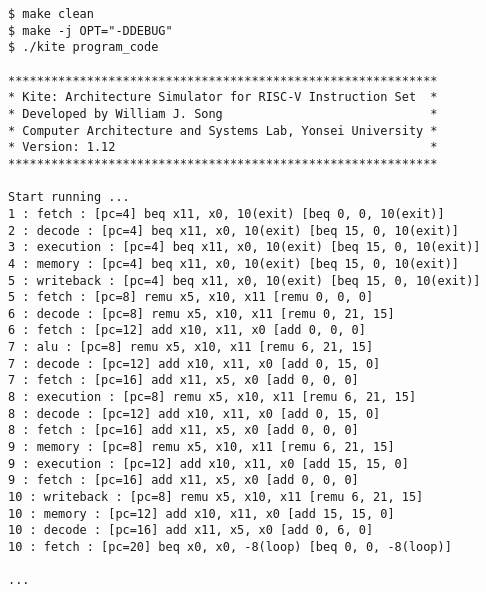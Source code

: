 \documentclass[10pt]{article}
\begin{document}
\begin{Verbatim}[frame=single,fontsize=\small]
$ make clean
$ make -j OPT="-DDEBUG" 
$ ./kite program_code

************************************************************
* Kite: Architecture Simulator for RISC-V Instruction Set  *
* Developed by William J. Song                             *
* Computer Architecture and Systems Lab, Yonsei University *
* Version: 1.12                                            *
************************************************************

Start running ...
1 : fetch : [pc=4] beq x11, x0, 10(exit) [beq 0, 0, 10(exit)]
2 : decode : [pc=4] beq x11, x0, 10(exit) [beq 15, 0, 10(exit)]
3 : execution : [pc=4] beq x11, x0, 10(exit) [beq 15, 0, 10(exit)]
4 : memory : [pc=4] beq x11, x0, 10(exit) [beq 15, 0, 10(exit)]
5 : writeback : [pc=4] beq x11, x0, 10(exit) [beq 15, 0, 10(exit)]
5 : fetch : [pc=8] remu x5, x10, x11 [remu 0, 0, 0]
6 : decode : [pc=8] remu x5, x10, x11 [remu 0, 21, 15]
6 : fetch : [pc=12] add x10, x11, x0 [add 0, 0, 0]
7 : alu : [pc=8] remu x5, x10, x11 [remu 6, 21, 15]
7 : decode : [pc=12] add x10, x11, x0 [add 0, 15, 0]
7 : fetch : [pc=16] add x11, x5, x0 [add 0, 0, 0]
8 : execution : [pc=8] remu x5, x10, x11 [remu 6, 21, 15]
8 : decode : [pc=12] add x10, x11, x0 [add 0, 15, 0]
8 : fetch : [pc=16] add x11, x5, x0 [add 0, 0, 0]
9 : memory : [pc=8] remu x5, x10, x11 [remu 6, 21, 15]
9 : execution : [pc=12] add x10, x11, x0 [add 15, 15, 0]
9 : fetch : [pc=16] add x11, x5, x0 [add 0, 0, 0]
10 : writeback : [pc=8] remu x5, x10, x11 [remu 6, 21, 15]
10 : memory : [pc=12] add x10, x11, x0 [add 15, 15, 0]
10 : decode : [pc=16] add x11, x5, x0 [add 0, 6, 0]
10 : fetch : [pc=20] beq x0, x0, -8(loop) [beq 0, 0, -8(loop)]

...
\end{Verbatim}
\end{document}
